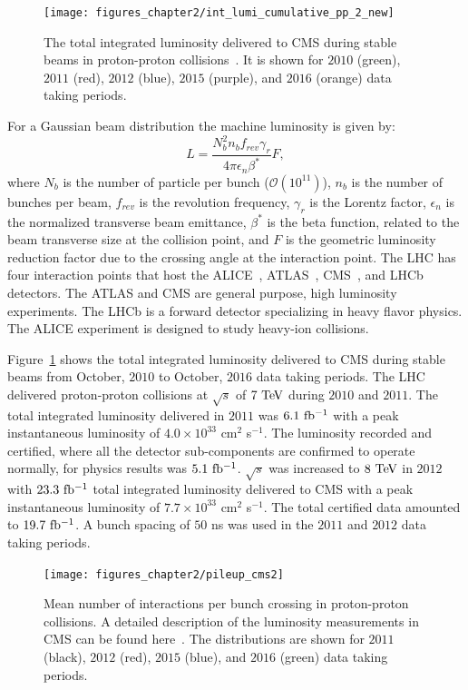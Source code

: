 \begin{figure}[h]
\centering
\texttt{[image: figures\_chapter2/int\_lumi\_cumulative\_pp\_2\_new]}
\caption{The total integrated luminosity delivered to CMS during stable beams in proton-proton collisions~\cite{lumi_plot}. It is shown for $2010$ (green), $2011$ (red), $2012$ (blue), $2015$ (purple), and $2016$ (orange) data taking periods.} 
\label{fig:int}
\end{figure}

For a Gaussian beam distribution the machine luminosity is given by:
\begin{equation} \label{eq:lumi_beam}
L = \frac{N_{b}^2n_bf_{rev}\gamma_{r}}{4\pi\epsilon_n\beta^{*}}F,
\end{equation}
where $N_b$ is the number of particle per bunch ($\mathcal{O}(10^{11})$), $n_b$ is the number of bunches per beam, $f_{rev}$ is the revolution frequency, $\gamma_r$ is the Lorentz factor, $\epsilon_n$ is the normalized transverse beam emittance, $\beta^{*}$ is the beta function, related to the beam transverse size at the collision point, and $F$ is the geometric luminosity reduction factor due to the crossing angle at the interaction point.  The LHC has four interaction points that host the ALICE~\cite{Aamodt:2008zz}, ATLAS~\cite{Aad:2008zzm}, CMS~\cite{Chatrchyan:2008aa}, and LHCb~\cite{Alves:2008zz} detectors. The ATLAS and CMS are general purpose, high luminosity experiments. The LHCb is a forward detector specializing in heavy flavor physics. The ALICE experiment is designed to study heavy-ion collisions.   

Figure~\ref{fig:int} shows the total integrated luminosity delivered to CMS during stable beams from October, $2010$ to October, $2016$ data taking periods. The LHC delivered proton-proton collisions at $\sqrt{s}$ of $7~\mathrm{Te\kern -0.1em V}$ during $2010$ and $2011$. The total integrated luminosity delivered in $2011$ was $6.1~\mathrm{fb^{-1}}$ with a peak instantaneous luminosity of $4.0 \times 10^{33}$ cm$^2$ s$^{-1}$. The luminosity recorded and certified, where all the detector sub-components are confirmed to operate normally, for physics results was $5.1~\mathrm{fb^{-1}}$. $\sqrt{s}$ was increased to $8~\mathrm{Te\kern -0.1em V}$ in $2012$ with $23.3~\mathrm{fb^{-1}}$ total integrated luminosity delivered to CMS with a peak instantaneous luminosity of $7.7 \times 10^{33}$ cm$^2$ s$^{-1}$. The total certified data amounted to $19.7~\mathrm{fb^{-1}}$. A bunch spacing of $50$ ns was used in the $2011$ and $2012$ data taking periods. 

\begin{figure}[h]
\centering
\texttt{[image: figures\_chapter2/pileup\_cms2]}
\caption{Mean number of interactions per bunch crossing in proton-proton collisions. A detailed description of the  luminosity measurements in CMS can be found here~\cite{CMS-PAS-LUM-13-001,CMS-PAS-LUM-15-001}. The distributions are shown for $2011$ (black), $2012$ (red), $2015$ (blue), and $2016$ (green) data taking periods.}
\label{fig:pu}
\end{figure} 

